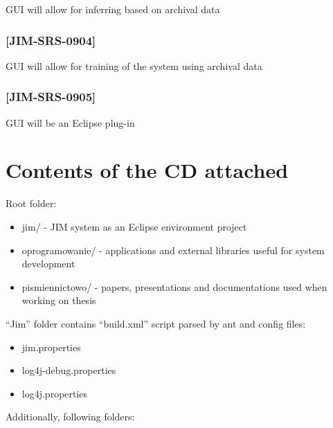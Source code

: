 \documentclass[10pt,oneside]{memoir}
\begin{document}
GUI will allow for inferring based on archival data


\section{[JIM-SRS-0904]}
\label{jim-srs-0904}

GUI will allow for training of the system using archival data


\section{[JIM-SRS-0905]}
\label{jim-srs-0905}

GUI will be an Eclipse plug-in


\part{Contents of the CD attached}
\label{appendixb}

Root folder:


\begin{itemize}


\item jim/ -  JIM system as an Eclipse environment project

\item oprogramowanie/ - applications and external libraries useful for system development

\item pismiennictowo/ - papers, presentations and documentations used when working on thesis
\end{itemize}

``Jim'' folder contains ``build.xml'' script parsed by ant and config files:


\begin{itemize}


\item jim.properties

\item log4j-debug.properties

\item log4j.properties
\end{itemize}

Additionally, following folders:
\end{document}

